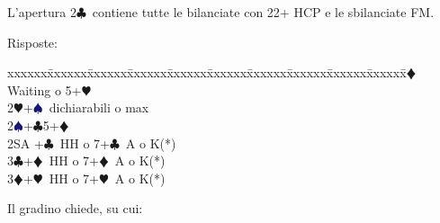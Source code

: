 \documentclass[a4paper,italian]{article}
\newcommand{\BC}{\textcolor{OliveGreen}{$\clubsuit$}}
\newcommand{\BD}{\textcolor{RedOrange}{$\vardiamondsuit$}}
\newcommand{\BH}{\textcolor{Red2}{$\varheartsuit${}}}
\newcommand{\BS}{\textcolor{MidnightBlue}{$\spadesuit${}}}
\newenvironment{bidtable}
{\begin{tabbing}

    xxxxxx\=xxxxxx\=xxxxxx\=xxxxxx\=xxxxxx\=xxxxxx\=xxxxxx\=xxxxxx\=xxxxxx\=xxxxxx\=\kill}
{\end{tabbing} }%
\newenvironment{varie}[1]
{\begin{tcolorbox}[colframe=green!40!black,title=#1]}
    {
\end{tcolorbox} }%
\begin{document}
\begin{multicols}{2}

    L'apertura 2\BC\ contiene tutte le bilanciate con 22+ HCP e le sbilanciate FM.

    Risposte:

    \begin{bidtable}
        2\BD \> Waiting o 5+\BH \\
        2\BH {}+\BS\ dichiarabili o max\\
        2\BS {}+\BC 5+\BD \\
        2SA +\BC\ HH o 7+\BC\ A o K(*)\\
        3\BC {}+\BD\ HH o 7+\BD\ A o K(*)\\
        3\BD {}+\BH\ HH o 7+\BH\ A o K(*)
    \end{bidtable}
    \begin{varie}{(*) Relay richiesta onori}

        Il gradino chiede, su cui:


\end{varie}
\end{multicols}
\end{document}
